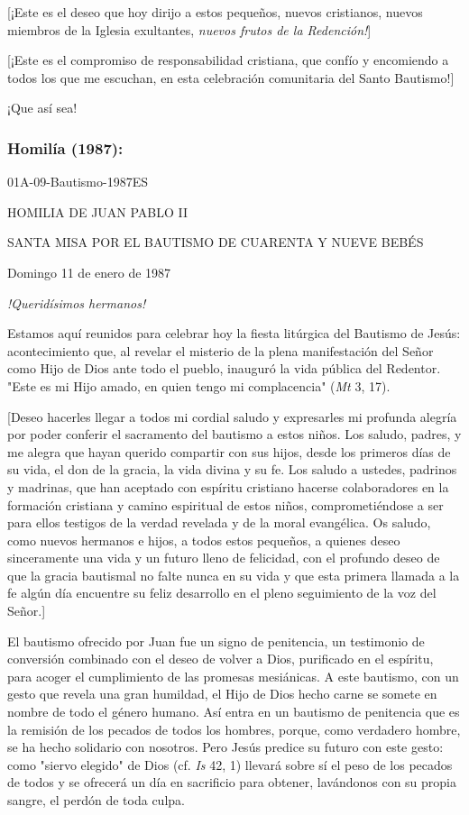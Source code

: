\begin{body}
{[}¡Este es el deseo que hoy dirijo a estos pequeños, nuevos cristianos, nuevos miembros de la Iglesia exultantes, \emph{nuevos frutos de la Redención!}{]}

{[}¡Este es el compromiso de responsabilidad cristiana, que confío y encomiendo a todos los que me escuchan, en esta celebración comunitaria del Santo Bautismo!{]}

¡Que así sea!

\subsubsection{Homilía (1987): } 01A-09-Bautismo-1987ES

HOMILIA DE JUAN PABLO II

SANTA MISA POR EL BAUTISMO DE CUARENTA Y NUEVE BEBÉS

Domingo 11 de enero de 1987

\emph{!Queridísimos hermanos!}

Estamos aquí reunidos para celebrar hoy la fiesta litúrgica del Bautismo de Jesús: acontecimiento que, al revelar el misterio de la plena manifestación del Señor como Hijo de Dios ante todo el pueblo, inauguró la vida pública del Redentor. "Este es mi Hijo amado, en quien tengo mi complacencia" (\emph{Mt} 3, 17).

{[}Deseo hacerles llegar a todos mi cordial saludo y expresarles mi profunda alegría por poder conferir el sacramento del bautismo a estos niños. Los saludo, padres, y me alegra que hayan querido compartir con sus hijos, desde los primeros días de su vida, el don de la gracia, la vida divina y su fe. Los saludo a ustedes, padrinos y madrinas, que han aceptado con espíritu cristiano hacerse colaboradores en la formación cristiana y camino espiritual de estos niños, comprometiéndose a ser para ellos testigos de la verdad revelada y de la moral evangélica. Os saludo, como nuevos hermanos e hijos, a todos estos pequeños, a quienes deseo sinceramente una vida y un futuro lleno de felicidad, con el profundo deseo de que la gracia bautismal no falte nunca en su vida y que esta primera llamada a la fe algún día encuentre su feliz desarrollo en el pleno seguimiento de la voz del Señor.{]}

El bautismo ofrecido por Juan fue un signo de penitencia, un testimonio de conversión combinado con el deseo de volver a Dios, purificado en el espíritu, para acoger el cumplimiento de las promesas mesiánicas. A este bautismo, con un gesto que revela una gran humildad, el Hijo de Dios hecho carne se somete en nombre de todo el género humano. Así entra en un bautismo de penitencia que es la remisión de los pecados de todos los hombres, porque, como verdadero hombre, se ha hecho solidario con nosotros. Pero Jesús predice su futuro con este gesto: como "siervo elegido" de Dios (cf. \emph{Is} 42, 1) llevará sobre sí el peso de los pecados de todos y se ofrecerá un día en sacrificio para obtener, lavándonos con su propia sangre, el perdón de toda culpa.


\end{body}
